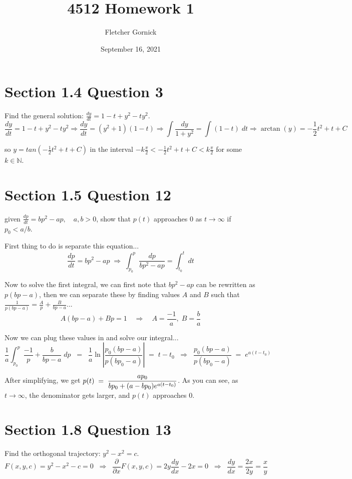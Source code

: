 \documentclass[11pt]{article}
\title{4512 Homework 1}
\author{Fletcher Gornick}
\date{September 16, 2021}
\begin{document}
 \maketitle 

 \section*{Section 1.4 Question 3}
 Find the general solution: $\frac{dy}{dt} = 1 - t + y^2 - ty^2$.
 $$\frac{dy}{dt} = 1 - t + y^2 - ty^2 \Rightarrow
 \frac{dy}{dt} = (y^2+1)(1-t) \Rightarrow
 \int \frac{dy}{1+y^2} = \int (1-t) \; dt \Rightarrow
 \arctan(y) = -\frac{1}{2}t^2+t+C$$

 so $y = tan(-\frac{1}{2}t^2+t+C)$ in the interval 
 $-k \frac{\pi}{2} < -\frac{1}{2}t^2+t+C < k \frac{\pi}{2}$
 for some $k \in \mathbb{N}$.

 \section*{Section 1.5 Question 12}
 given $\frac{dp}{dt} = bp^2 - ap, \quad a,b > 0$, show that 
 $p(t)$ approaches $0$ as $t \rightarrow \infty$ if $p_0 < a/b$.

 First thing to do is separate this equation...
$$\frac{dp}{dt}=bp^2-ap \; \Rightarrow \; \int_{p_0}^{p} \frac{dp}{bp^2-ap} = 
\int_{t_0}^{t} dt$$

Now to solve the first integral, we can first note that $bp^2-ap$ can be rewritten as
$p(bp-a)$, then we can separate these by finding values $A$ and $B$ such that
$\frac{1}{p(bp-a)} = \frac{A}{p} + \frac{B}{bp-a}$...
$$A(bp-a)+Bp = 1 \quad \Rightarrow \quad A = \frac{-1}{a}, \; B = \frac{b}{a}$$

Now we can plug these values in and solve our integral...
$$\frac{1}{a} \int_{p_0}^{p} \frac{-1}{p} + \frac{b}{bp-a} \; dp \;\; = \;\;
\frac{1}{a}\ln{\left|\frac{p_0(bp-a)}{p(bp_0-a)}\right|} \;=\; t-t_0 \;\; \Rightarrow
\;\; \frac{p_0(bp-a)}{p(bp_0-a)} \; = \; e^{a(t-t_0)} $$

After simplifying, we get 
$\mathlarger{p(t) \;=\; \frac{ap_0}{bp_0 + (a-bp_0)e^{a(t-t_0)}}}$.  As you can see,
as $t \rightarrow \infty$, the denominator gets larger, and $p(t)$ approaches 0.

 \section*{Section 1.8 Question 13}
 Find the orthogonal trajectory: $y^2 - x^2 = c$.
 $$F(x,y,c) = y^2-x^2-c=0 \;\; \Rightarrow \;\;
 \frac{\partial}{\partial x}F(x,y,c) = 2y \frac{dy}{dx} - 2x = 0 \;\; \Rightarrow \;\;
 \frac{dy}{dx} = \frac{2x}{2y} = \frac{x}{y}$$
\end{document}
